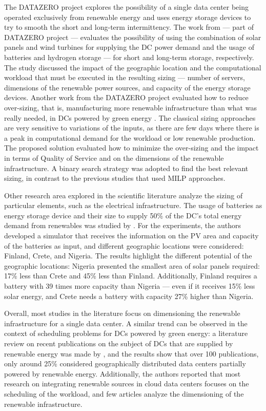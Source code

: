 The DATAZERO \citep{datazero} project explores the possibility of a single data center being operated exclusively from renewable energy and uses energy storage devices to try to smooth the short and long-term intermittency. The work from \citet{HADDAD2021100505} --- part of DATAZERO project --- evaluates the possibility of using the combination of solar panels and wind turbines for supplying the DC power demand and the usage of batteries and hydrogen storage --- for short and long-term storage, respectively. The study discussed the impact of the geographic location and the computational workload that must be executed in the resulting sizing --- number of servers, dimensions of the renewable power sources, and capacity of the energy storage devices. Another work from the DATAZERO project evaluated how to reduce over-sizing, that is, manufacturing more renewable infrastructure than what was really needed, in DCs powered by green energy \citep{manal2022}. The classical sizing approaches are very sensitive to variations of the inputs, as there are few days where there is a peak in computational demand for the workload or low renewable production. The proposed solution evaluated how to minimize the over-sizing and the impact in terms of Quality of Service and on the dimensions of the renewable infrastructure. A binary search strategy was adopted to find the best relevant sizing, in contrast to the previous studies that used MILP approaches.


Other research area explored in the scientific literature analyze the sizing of particular elements, such as the electrical infrastructure. The usage of batteries as energy storage device and their size to supply 50\% of the DC's total energy demand from renewables was studied by \citet{sheme2018_batsize}. For the experiments, the authors developed a simulator that receives the information on the PV area and capacity of the batteries as input, and different geographic locations were considered: Finland, Crete, and Nigeria. The results highlight the different potential of the geographic locations: Nigeria presented the smallest area of solar panels required: 17\% less than Crete and 45\% less than Finland. Additionally, Finland requires a battery with 39 times more capacity than Nigeria --- even if it receives 15\% less solar energy, and Crete needs a battery with capacity 27\% higher than Nigeria.


Overall, most studies in the literature focus on dimensioning the renewable infrastructure for a single data center. A similar trend can be observed in the context of scheduling problems for DCs powered by green energy:  a literature review on recent publications on the subject of DCs that are supplied by renewable energy was made by \citet{SONG2022326}, and the results show that over 100 publications, only around 25\% considered geographically distributed data centers partially powered by renewable energy. Additionally, the authors reported that most research on integrating renewable sources in cloud data centers focuses on the scheduling of the workload, and few articles analyze the dimensioning of the renewable infrastructure.


